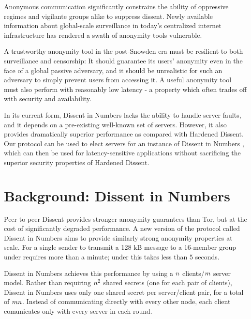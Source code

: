 Anonymous communication significantly constrains the ability of oppressive
regimes and vigilante groups alike to suppress dissent. Newly available
information about global-scale surveillance in today's
centralized internet infrastructure has rendered a swath of anonymity tools
vulnerable.

A trustworthy anonymity tool in the post-Snowden era must be resilient to both
surveillance and censorship: It should guarantee its users' anonymity even in
the face of a global passive adversary, and it should be unrealistic for such an
adversary to simply prevent users from accessing it. A useful anonymity tool
must also perform with reasonably low latency - a property which often trades
off with security and availability.

In its current form, Dissent in Numbers lacks the ability to handle server
faults, and it depends on a pre-existing well-known set of servers. However, it
also provides dramatically superior performance as compared with Hardened
Dissent.
Our protocol can be used to elect servers for an instance of Dissent in
Numbers \cite{din}, which can then be used for latency-sensitive applications
without sacrificing the superior security properties of Hardened Dissent.


\section{Background: Dissent in Numbers}
  Peer-to-peer Dissent provides stronger anonymity guarantees than Tor, but at
  the cost of significantly degraded performance. A new version of the
  protocol called Dissent in Numbers \cite{din} aims to provide similarly
  strong anonymity properties at scale. For a single sender to transmit a 128
  kB message to a 16-member group under \cite{p2pd} requires more than a
  minute; under \cite{din} this takes less than 5 seconds.

  Dissent in Numbers achieves this performance by using a $n$
  clients/$m$ server model.
  Rather than requiring $ n^2$ shared secrets (one for each pair of
  clients), Dissent in Numbers uses only one shared secret per server/client
  pair, for a total of $mn$. Instead of communicating
  directly with every other node, each client comunicates only with every
  server in each round.

